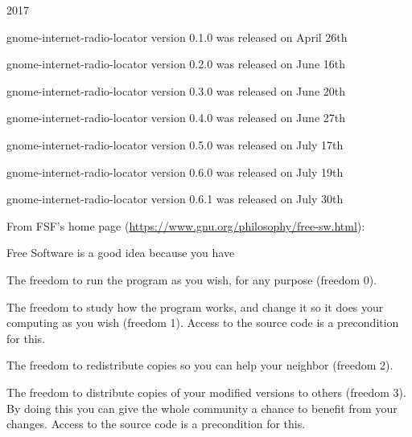 \documentclass[20pt,landscape]{foils}
\begin{document}
\begin{list1}
\item 2017
  \begin{list2}  
  \item gnome-internet-radio-locator version 0.1.0 was released on April 26th
  \end{list2}
  \begin{list2}
  \item gnome-internet-radio-locator version 0.2.0 was released on June 16th
  \end{list2}    
  \begin{list2}
  \item gnome-internet-radio-locator version 0.3.0 was released on June 20th
  \end{list2}
  \begin{list2}
  \item gnome-internet-radio-locator version 0.4.0 was released on June 27th
  \end{list2}
  \begin{list2}
  \item gnome-internet-radio-locator version 0.5.0 was released on July 17th
  \end{list2}
  \begin{list2}
  \item gnome-internet-radio-locator version 0.6.0 was released on July 19th
  \end{list2}
  \begin{list2}
  \item gnome-internet-radio-locator version 0.6.1 was released on July 30th
  \end{list2}
\end{list1}


From FSF's home page (\url{https://www.gnu.org/philosophy/free-sw.html}):

\begin{list1}
\item Free Software is a good idea because you have
  \begin{list2}
    \item The freedom to run the program as you wish, for any purpose (freedom 0).
    \item The freedom to study how the program works, and change it so it does your computing as you wish (freedom 1). Access to the source code is a precondition for this.
    \item The freedom to redistribute copies so you can help your neighbor (freedom 2).
    \item The freedom to distribute copies of your modified versions to others (freedom 3). By doing this you can give the whole community a chance to benefit from your changes. Access to the source code is a precondition for this.
  \end{list2}
\end{list1}
\end{document}
